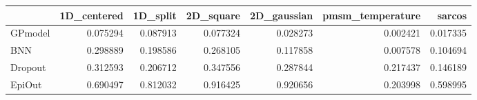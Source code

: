 \begin{tabular}{lrrrrrr}
\toprule
{} &  1D\_centered &  1D\_split &  2D\_square &  2D\_gaussian &  pmsm\_temperature &    sarcos \\
\midrule
GPmodel &     0.075294 &  0.087913 &   0.077324 &     0.028273 &          0.002421 &  0.017335 \\
BNN     &     0.298889 &  0.198586 &   0.268105 &     0.117858 &          0.007578 &  0.104694 \\
Dropout &     0.312593 &  0.206712 &   0.347556 &     0.287844 &          0.217437 &  0.146189 \\
EpiOut  &     0.690497 &  0.812032 &   0.916425 &     0.920656 &          0.203998 &  0.598995 \\
\bottomrule
\end{tabular}
